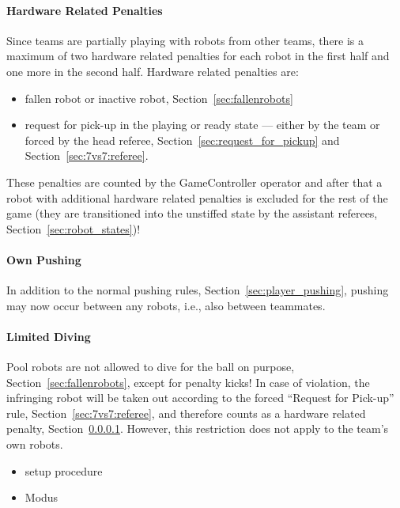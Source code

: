         \paragraph{Hardware Related Penalties}
            \label{sec:7vs7:hardware_related_penalties}
            Since teams are partially playing with robots from other teams, there is a maximum of two hardware related penalties for each robot in the first half and one more in the second half.
            Hardware related penalties are:
            \begin{itemize}
                \item fallen robot or inactive robot, \cf Section~\ref{sec:fallenrobots}
                \item request for pick-up in the playing or ready state — either by the team or forced by the head referee, \cf Section~\ref{sec:request_for_pickup} and Section~\ref{sec:7vs7:referee}.
            \end{itemize}
            These penalties are counted by the GameController operator and after that a robot with additional hardware related penalties is excluded for the rest of the game (they are transitioned into the unstiffed state by the assistant referees, \cf Section~\ref{sec:robot_states})!

        \paragraph{Own Pushing}
            In addition to the normal pushing rules, \cf Section~\ref{sec:player_pushing}, pushing may now occur between any robots, i.e., also between teammates.

        \paragraph{Limited Diving}
            Pool robots are not allowed to dive for the ball on purpose, \cf Section~\ref{sec:fallenrobots}, except for penalty kicks! In case of violation, the infringing robot will be taken out according to the forced ``Request for Pick-up'' rule, \cf Section~\ref{sec:7vs7:referee}, and therefore counts as a hardware related penalty, \cf Section~\ref{sec:7vs7:hardware_related_penalties}. However, this restriction does not apply to the team's own robots.

        \begin{itemize}
            \item setup procedure %
            \item Modus %
        \end{itemize}



